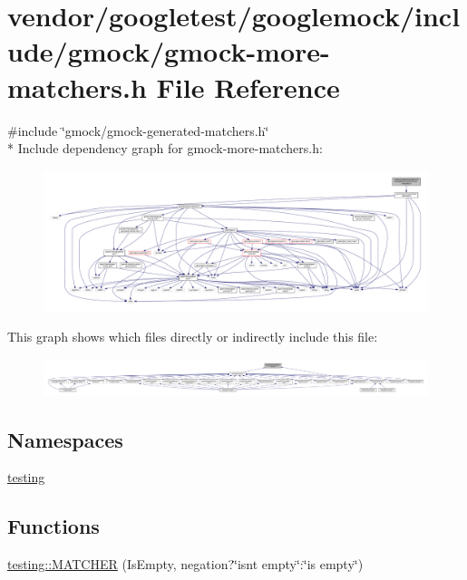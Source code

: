 \hypertarget{gmock-more-matchers_8h}{}\section{vendor/googletest/googlemock/include/gmock/gmock-\/more-\/matchers.h File Reference}
\label{gmock-more-matchers_8h}
{\ttfamily \#include \char`\"{}gmock/gmock-\/generated-\/matchers.\+h\char`\"{}}\\*
Include dependency graph for gmock-\/more-\/matchers.h\+:
\nopagebreak
\begin{figure}[H]
\begin{center}
\leavevmode
\includegraphics[width=350pt]{gmock-more-matchers_8h__incl}
\end{center}
\end{figure}
This graph shows which files directly or indirectly include this file\+:
\nopagebreak
\begin{figure}[H]
\begin{center}
\leavevmode
\includegraphics[width=350pt]{gmock-more-matchers_8h__dep__incl}
\end{center}
\end{figure}
\subsection*{Namespaces}
\begin{DoxyCompactItemize}
\item 
 \hyperlink{namespacetesting}{testing}
\end{DoxyCompactItemize}
\subsection*{Functions}
\begin{DoxyCompactItemize}
\item 
\hyperlink{namespacetesting_a25b4065291778029b6311f07c2fc9cc3}{testing\+::\+M\+A\+T\+C\+H\+ER} (Is\+Empty, negation?\char`\"{}isn\textquotesingle{}t empty\char`\"{}\+:\char`\"{}is empty\char`\"{})
\end{DoxyCompactItemize}
